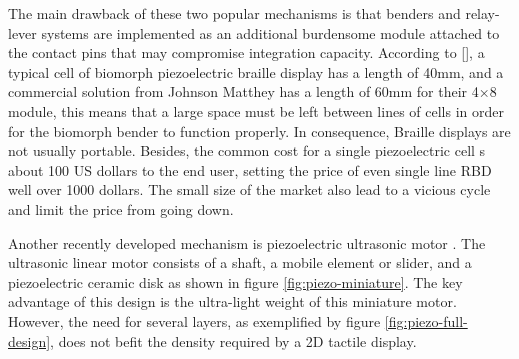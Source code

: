 The main drawback of these two popular mechanisms is that benders and relay-lever systems are implemented as an additional burdensome module attached to the contact pins that may compromise integration capacity. According to [], a typical cell of biomorph piezoelectric braille display has a length of 40mm, and a commercial solution from Johnson Matthey has a length of 60mm for their 4×8 module, this means that a large space must be left between lines of cells in order for the biomorph bender to function properly. 
In consequence, Braille displays are not usually portable. Besides, the common cost for a single piezoelectric cell s about 100 US dollars to the end user, setting the price of even single line RBD well over 1000 dollars. The small size of the market also lead to a vicious cycle and limit the price from going down.

Another recently developed mechanism is piezoelectric ultrasonic motor \cite{hernandez_characterization_2009}.
The ultrasonic linear motor consists of a shaft, a mobile element or slider, and a piezoelectric ceramic disk as shown in figure \ref{fig:piezo-miniature}.
The key advantage of this design is the ultra-light weight of this miniature motor.
However, the need for several layers, as exemplified by figure \ref{fig:piezo-full-design}, does not befit the density required by a 2D tactile display.

